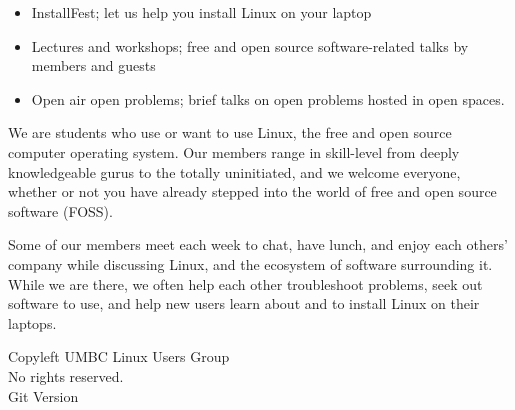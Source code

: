 \documentclass[11pt]{article}
\newcommand{\foss}{FOSS}
\begin{document}
\begin{multicols*}{2}
\begin{itemize}
    \item InstallFest; let us help you install Linux on your laptop
    \item Lectures and workshops; free and open source software-related talks by
        members and guests
    \item Open air open problems; brief talks on open problems hosted in open
        spaces.
\end{itemize}


\vfill
\phantom{x}
\columnbreak{}



We are students who use or want to use Linux, the free and open source computer
operating system. Our members range in skill-level from deeply knowledgeable
gurus to the totally uninitiated, and we welcome everyone, whether or not you
have already stepped into the world of free and open source software (\foss).

Some of our members meet each week to chat, have lunch, and enjoy each others'
company while discussing Linux, and the ecosystem of software surrounding it.
While we are there, we often help each other troubleshoot problems, seek out
software to use, and help new users learn about and to install Linux on their
laptops.

\phantom{x}
\vfill
\begin{center} \tiny
    \textcopyleft{} Copyleft \the\year{} UMBC Linux Users Group \\
    No rights reserved. \\
    Git Version 
\end{center}
\end{multicols*}
\end{document}
